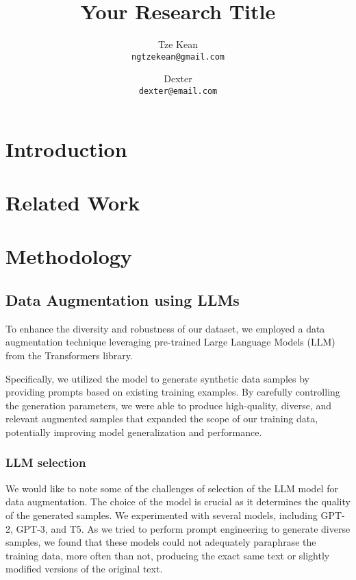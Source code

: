 \documentclass{article}
\title{Your Research Title}
\author{
  Tze Kean \\
  \texttt{ngtzekean@gmail.com}
  \and
  Dexter \\
  \texttt{dexter@email.com}
}
\begin{document}
\maketitle

\begin{abstract}
\end{abstract}

\section{Introduction}

\section{Related Work}

\section{Methodology}

\subsection{Data Augmentation using LLMs}

To enhance the diversity and robustness of our dataset, we employed a data
augmentation technique leveraging pre-trained Large Language Models (LLM) from
the Transformers library.

Specifically, we utilized the model to generate synthetic data samples by
providing prompts based on existing training examples. By carefully controlling
the generation parameters, we were able to produce high-quality, diverse, and
relevant augmented samples that expanded the scope of our training data,
potentially improving model generalization and performance.

\subsubsection{LLM selection}

We would like to note some of the challenges of selection of the LLM model for
data augmentation. The choice of the model is crucial as it determines the
quality of the generated samples. We experimented with several models, including
GPT-2, GPT-3, and T5. As we tried to perform prompt engineering to generate
diverse samples, we found that these models could not adequately paraphrase
the training data, more often than not, producing the exact same text or
slightly modified versions of the original text.
\end{document}
